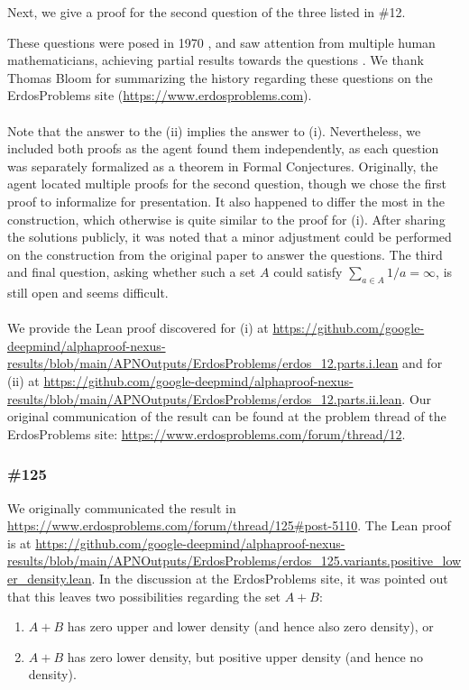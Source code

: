 Next, we give a proof for the second question of the three listed in {\erdos} \#12.



These questions were posed in 1970 \cite{Erds1970OnTD}, and saw attention from multiple human mathematicians, achieving partial results towards the questions \cite{SCHOEN2001191, Baier2004ANO, elsholtz2016erd}. We thank Thomas Bloom for summarizing the history regarding these questions on the ErdosProblems site (\url{https://www.erdosproblems.com}). 
\\\\
Note that the answer to the (ii) implies the answer to (i). Nevertheless, we included both proofs as the agent found them independently, as each question was separately formalized as a theorem in Formal Conjectures. Originally, the agent located multiple proofs for the second question, though we chose the first proof to informalize for presentation. It also happened to differ the most in the construction, which otherwise is quite similar to the proof for (i). After sharing the solutions publicly, it was noted that a minor adjustment could be performed on the construction from the original paper to answer the questions. The third and final question, asking whether such a set $A$ could satisfy $\sum_{a \in A} 1/a = \infty$, is still open and seems difficult.
\\\\
We provide the Lean proof discovered for (i) at \url{https://github.com/google-deepmind/alphaproof-nexus-results/blob/main/APNOutputs/ErdosProblems/erdos_12.parts.i.lean} and for (ii) at \url{https://github.com/google-deepmind/alphaproof-nexus-results/blob/main/APNOutputs/ErdosProblems/erdos_12.parts.ii.lean}. Our original communication of the result can be found at the problem thread of the ErdosProblems site:  \url{https://www.erdosproblems.com/forum/thread/12}.


\subsubsection*{{\erdos} \#125}


        
We originally communicated the result in \url{https://www.erdosproblems.com/forum/thread/125#post-5110}. The Lean proof is at \url{https://github.com/google-deepmind/alphaproof-nexus-results/blob/main/APNOutputs/ErdosProblems/erdos_125.variants.positive_lower_density.lean}. In the discussion at the ErdosProblems site, it was pointed out that this leaves two possibilities regarding the set $A+B$:
\begin{enumerate}
    \item $A+B$ has zero upper and lower density (and hence also zero density), or
    \item $A+B$ has zero lower density, but positive upper density (and hence no density).
\end{enumerate}

